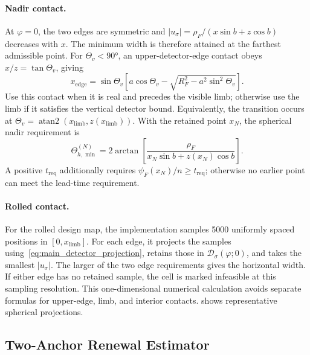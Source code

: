 \paragraph{Nadir contact.}
At $\varphi=0$, the two edges are symmetric and $|u_\sigma|=\rho_F/(x\sin b+z\cos b)$ decreases with $x$. The minimum width is therefore attained at the farthest admissible point. For $\Theta_v<\ang{90}$, an upper-detector-edge contact obeys $x/z=\tan\Theta_v$, giving
\begin{equation}
x_{\mathrm{edge}}
=\sin\Theta_v\left[a\cos\Theta_v-\sqrt{R_F^2-a^2\sin^2\Theta_v}\right].
\label{eq:nadir_upper_edge_contact}
\end{equation}
Use this contact when it is real and precedes the visible limb; otherwise use the limb if it satisfies the vertical detector bound. Equivalently, the transition occurs at $\Theta_v=\operatorname{atan2}(x_{\mathrm{limb}},z(x_{\mathrm{limb}}))$. With the retained point $x_N$, the spherical nadir requirement is
\begin{equation}
\Theta_{h,\min}^{(N)}
=2\arctan\!\left[\frac{\rho_F}{x_N\sin b+z(x_N)\cos b}\right].
\label{eq:engineering_horizontal_sizing}
\end{equation}
A positive $t_{\mathrm{req}}$ additionally requires $\psi_F(x_N)/n\geq t_{\mathrm{req}}$; otherwise no earlier point can meet the lead-time requirement.

\paragraph{Rolled contact.}
For the rolled design map, the implementation samples \num{5000} uniformly spaced positions in $[0,x_{\mathrm{limb}}]$. For each edge, it projects the samples using~\eqref{eq:main_detector_projection}, retains those in $\mathcal{D}_\sigma(\varphi;0)$, and takes the smallest $|u_\sigma|$. The larger of the two edge requirements gives the horizontal width. If either edge has no retained sample, the cell is marked infeasible at this sampling resolution. This one-dimensional numerical calculation avoids separate formulas for upper-edge, limb, and interior contacts.  shows representative spherical projections.

\subsection{Two-Anchor Renewal Estimator}
\label{sec:appendix_renewal}

